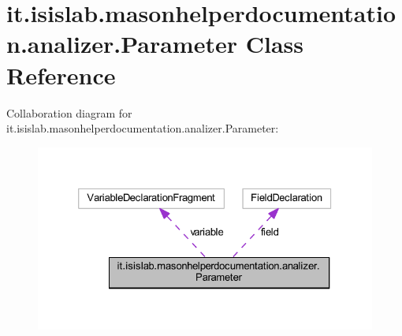 \hypertarget{classit_1_1isislab_1_1masonhelperdocumentation_1_1analizer_1_1_parameter}{\section{it.\-isislab.\-masonhelperdocumentation.\-analizer.\-Parameter Class Reference}
\label{classit_1_1isislab_1_1masonhelperdocumentation_1_1analizer_1_1_parameter}
}


Collaboration diagram for it.\-isislab.\-masonhelperdocumentation.\-analizer.\-Parameter\-:
\nopagebreak
\begin{figure}[H]
\begin{center}
\leavevmode
\includegraphics[width=326pt]{classit_1_1isislab_1_1masonhelperdocumentation_1_1analizer_1_1_parameter__coll__graph}
\end{center}
\end{figure}

